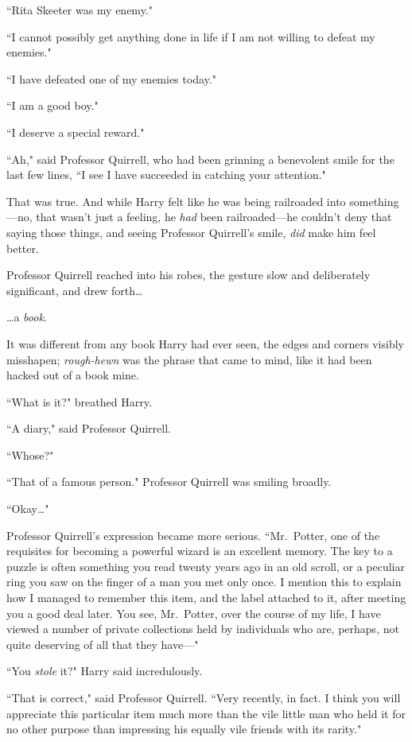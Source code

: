 ``Rita Skeeter was my enemy."

``I cannot possibly get anything done in life if I am not willing to defeat my enemies."

``I have defeated one of my enemies today."

``I am a good boy."

``I deserve a special reward."

``Ah," said Professor Quirrell, who had been grinning a benevolent smile for the last few lines, ``I see I have succeeded in catching your attention."

That was true. And while Harry felt like he was being railroaded into something---no, that wasn't just a feeling, he \emph{had} been railroaded---he couldn't deny that saying those things, and seeing Professor Quirrell's smile, \emph{did} make him feel better.

Professor Quirrell reached into his robes, the gesture slow and deliberately significant, and drew forth{\ldots}

{\ldots}a \emph{book}.

It was different from any book Harry had ever seen, the edges and corners visibly misshapen; \emph{rough-hewn} was the phrase that came to mind, like it had been hacked out of a book mine.

``What is it?" breathed Harry.

``A diary," said Professor Quirrell.

``Whose?"

``That of a famous person." Professor Quirrell was smiling broadly.

``Okay{\ldots}"

Professor Quirrell's expression became more serious. ``Mr.~Potter, one of the requisites for becoming a powerful wizard is an excellent memory. The key to a puzzle is often something you read twenty years ago in an old scroll, or a peculiar ring you saw on the finger of a man you met only once. I mention this to explain how I managed to remember this item, and the label attached to it, after meeting you a good deal later. You see, Mr.~Potter, over the course of my life, I have viewed a number of private collections held by individuals who are, perhaps, not quite deserving of all that they have---"

``You \emph{stole} it?" Harry said incredulously.

``That is correct," said Professor Quirrell. ``Very recently, in fact. I think you will appreciate this particular item much more than the vile little man who held it for no other purpose than impressing his equally vile friends with its rarity."


